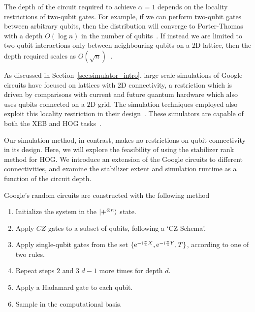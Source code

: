 The depth of the circuit required to achieve $\alpha=1$ depends on the locality restrictions of two-qubit gates. For example, if we can perform two-qubit gates between arbitrary qubits, then the distribution will converge to Porter-Thomas with a depth $O(\log{n})$ in the number of qubits~\cite{Emerson2098,Boixo2016}. If instead we are limited to two-qubit interactions only between neighbouring qubits on a $2$D lattice, then the depth required scales as $O(\sqrt{n})$~\cite{Harrow2018}.\par
As discussed in Section~\ref{sec:simulator_intro}, large scale simulations of Google circuits have focused on lattices with $2$D connectivity, a restriction which is driven by comparisons with current and future quantum hardware which also uses qubits connected on a $2$D grid. The simulation techniques employed also exploit this locality restriction in their design~\cite{Pendault2017,Chen2018b,Markov2018,Villalonga2019}. These simulators are capable of both the XEB and HOG tasks~\cite{Villalonga2019}.\par
Our simulation method, in contrast, makes no restrictions on qubit connectivity in its design. Here, we will explore the feasibility of using the stabilizer rank method for HOG. We introduce an extension of the Google circuits to different connectivities, and examine the stabilizer extent and simulation runtime as a function of the circuit depth.\par
Google's random circuits are constructed with the following method
\begin{enumerate}
    \item Initialize the system in the $\ket{+^{\otimes n}}$ state.
    \item Apply $CZ$ gates to a subset of qubits, following a `CZ Schema'.
    \item Apply single-qubit gates from the set $\{\mathrm{e}^{-i\frac{\pi}{4}X},\mathrm{e}^{-i\frac{\pi}{4}Y},T\}$, according to one of two rules.
    \item Repeat steps $2$ and $3$ $d-1$ more times for depth $d$.
    \item Apply a Hadamard gate to each qubit.
    \item Sample in the computational basis.
\end{enumerate}
